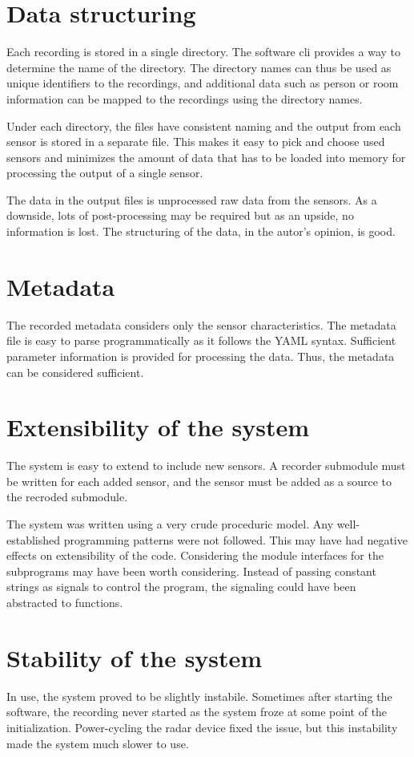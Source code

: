 \section{Data structuring}
Each recording is stored in a single directory.
The software \gls{cli} provides a way to determine the name of the directory.
The directory names can thus be used as unique identifiers to the recordings,
and additional data such as person or room information can be mapped to the recordings using the directory names.

Under each directory, the files have consistent naming and the output from each sensor is stored in a separate file.
This makes it easy to pick and choose used sensors and minimizes the amount of data that has to be loaded into memory
for processing the output of a single sensor.

The data in the output files is unprocessed raw data from the sensors.
As a downside, lots of post-processing may be required but as an upside, no information is lost.
The structuring of the data, in the autor's opinion, is good.

\section{Metadata}
The recorded metadata considers only the sensor characteristics.
The metadata file is easy to parse programmatically as it follows the YAML syntax.
Sufficient parameter information is provided for processing the data.
Thus, the metadata can be considered sufficient.

\section{Extensibility of the system}
The system is easy to extend to include new sensors.
A recorder submodule must be written for each added sensor,
and the sensor must be added as a source to the recroded submodule.

The system was written using a very crude proceduric model.
Any well-established programming patterns were not followed.
This may have had negative effects on extensibility of the code.
Considering the module interfaces for the subprograms may have been worth considering.
Instead of passing constant strings as signals to control the program,
the signaling could have been abstracted to functions.

\section{Stability of the system}
In use, the system proved to be slightly instabile.
Sometimes after starting the software,
the recording never started as the system froze at some point of the initialization.
Power-cycling the radar device fixed the issue,
but this instability made the system much slower to use.

